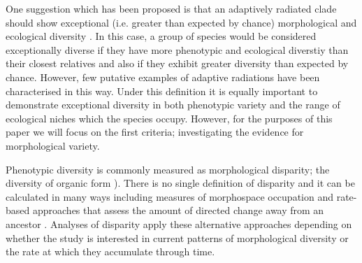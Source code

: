 \documentclass[12pt,a4paper]{article}
\begin{document}
One suggestion which has been proposed is that an adaptively radiated clade should show exceptional (i.e. greater than expected by chance) morphological and ecological diversity \citep{Losos2010a}. In this case, a group of species would be considered exceptionally diverse if they have more phenotypic and ecological diverstiy than their closest relatives and also if they exhibit greater diversity than expected by chance. However, few putative examples of adaptive radiations have been characterised in this way. %
Under this definition it is equally important to demonstrate exceptional diversity in both phenotypic variety and the range of ecological niches which the species occupy. However, for the purposes of this paper we will focus on the first criteria; investigating the evidence for morphological variety. 


Phenotypic diversity is commonly measured as morphological disparity; the diversity of organic form \citep{Foote1997,Erwin2007}). There is no single definition of disparity and it can be calculated in many ways including measures of morphospace occupation \citep[e.g.][]{Goswami2011, Brusatte2008} and rate-based approaches that assess the amount of directed change away from an ancestor \citep{OMeara2006, Price2013}. Analyses of disparity apply these alternative approaches depending on whether the study is interested in current patterns of morphological diversity or the rate at which they accumulate through time. 

\end{document}
